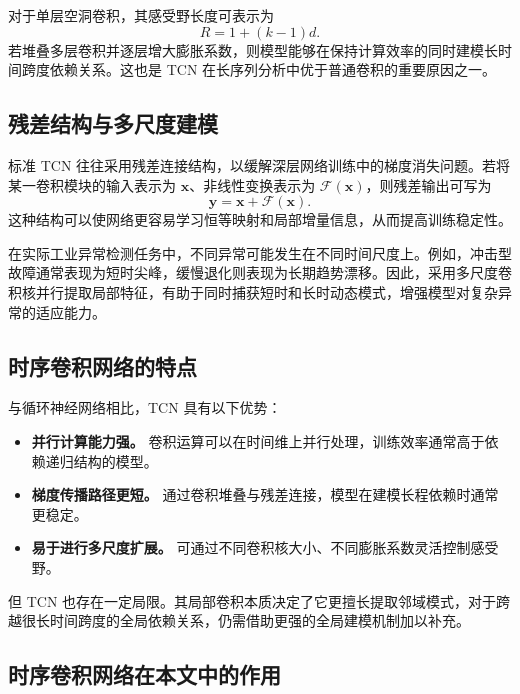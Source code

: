 对于单层空洞卷积，其感受野长度可表示为
\begin{equation}
    R = 1 + (k - 1)d.
\end{equation}
若堆叠多层卷积并逐层增大膨胀系数，则模型能够在保持计算效率的同时建模长时间跨度依赖关系。这也是 TCN 在长序列分析中优于普通卷积的重要原因之一。

\subsection{残差结构与多尺度建模}

标准 TCN 往往采用残差连接结构，以缓解深层网络训练中的梯度消失问题。若将某一卷积模块的输入表示为 $\mathbf{x}$、非线性变换表示为 $\mathcal{F}(\mathbf{x})$，则残差输出可写为
\begin{equation}
    \mathbf{y} = \mathbf{x} + \mathcal{F}(\mathbf{x}).
\end{equation}
这种结构可以使网络更容易学习恒等映射和局部增量信息，从而提高训练稳定性。

在实际工业异常检测任务中，不同异常可能发生在不同时间尺度上。例如，冲击型故障通常表现为短时尖峰，缓慢退化则表现为长期趋势漂移。因此，采用多尺度卷积核并行提取局部特征，有助于同时捕获短时和长时动态模式，增强模型对复杂异常的适应能力。

\subsection{时序卷积网络的特点}

与循环神经网络相比，TCN 具有以下优势：

\begin{itemize}
    \item \textbf{并行计算能力强。} 卷积运算可以在时间维上并行处理，训练效率通常高于依赖递归结构的模型。
    \item \textbf{梯度传播路径更短。} 通过卷积堆叠与残差连接，模型在建模长程依赖时通常更稳定。
    \item \textbf{易于进行多尺度扩展。} 可通过不同卷积核大小、不同膨胀系数灵活控制感受野。
\end{itemize}

但 TCN 也存在一定局限。其局部卷积本质决定了它更擅长提取邻域模式，对于跨越很长时间跨度的全局依赖关系，仍需借助更强的全局建模机制加以补充。

\subsection{时序卷积网络在本文中的作用}

